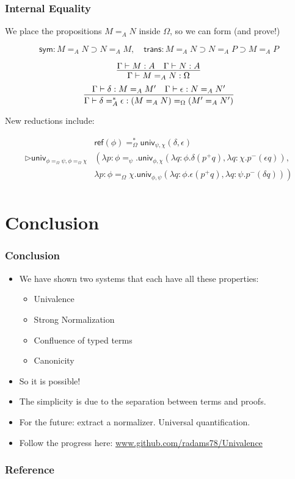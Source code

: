 \documentclass[handout]{beamer}
\newcommand{\reff}[1]{\ensuremath{\mathsf{ref} \left( {#1} \right)}}
\newcommand{\univ}[4]{\ensuremath{\mathsf{univ}_{{#1} , {#2}} \left( {#3} , {#4} \right)}}
\begin{document}
\begin{frame}
\frametitle{Internal Equality}
We place the propositions $M =_A N$ inside $\Omega$,
so we can form (and prove!)

\[ \mathsf{sym} : M =_A N \supset N =_A M , \quad
\mathsf{trans} : M =_A N \supset N =_A P \supset M =_A P \]

\[ \infer{\Gamma \vdash M =_A N : \Omega}{\Gamma \vdash M : A \quad \Gamma \vdash N : A} \]
\[ \infer{\Gamma \vdash \delta =^*_A \epsilon : (M =_A N) =_\Omega (M' =_A N')}
{\Gamma \vdash \delta : M =_A M' \quad \Gamma \vdash \epsilon : N =_A N'} \]

New reductions include:

\begin{align*}
& \reff{\phi} =^*_\Omega \univ{\psi}{\chi}{\delta}{\epsilon} \\ \rhd 
  \mathsf{univ}_{\phi =_\Omega \psi,\phi =_\Omega \chi}
& \left( \lambda p:\phi =_\psi. \univ{\phi}{\chi}{\lambda q:\phi.\delta (p^+ q)}
    {\lambda q : \chi. p^- (\epsilon q)}, \right. \\ 
&  \left. \lambda p:\phi =_\Omega \chi. \univ{\phi}{\psi}{\lambda q:\phi. \epsilon (p^+ q)}
    {\lambda q : \psi. p^- (\delta q)} \right) \\
\end{align*}
\end{frame}

\section{Conclusion}

\begin{frame}
\frametitle{Conclusion}
\begin{itemize}[<+->]
\item
We have shown two systems that each have all these properties:
\begin{itemize}
\item
Univalence
\item
Strong Normalization
\item
Confluence of typed terms
\item
Canonicity
\end{itemize}
\item
So it is possible!
\item
The simplicity is due to the separation between terms and proofs.
\item
For the future: extract a normalizer.  Universal quantification.
\item
Follow the progress here: \url{www.github.com/radams78/Univalence}
\end{itemize}
\end{frame}

\appendix

\begin{frame}
\frametitle{Reference}

\end{frame}
\end{document}
